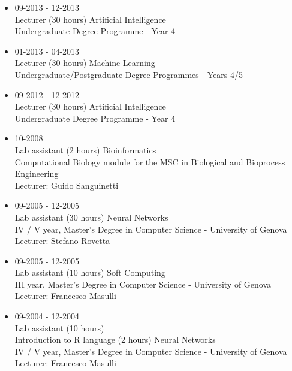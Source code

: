 \documentclass[a4paper,10pt]{article}
\begin{document}
\begin{itemize}
\item 09-2013 - 12-2013 \\
  Lecturer (30 hours)
  Artificial Intelligence \\
  Undergraduate Degree Programme - Year 4
\item 01-2013 - 04-2013 \\
  Lecturer (30 hours)
  Machine Learning \\
  Undergraduate/Postgraduate Degree Programmes - Years 4/5
\item 09-2012 - 12-2012 \\
  Lecturer (30 hours)
  Artificial Intelligence \\
  Undergraduate Degree Programme - Year 4
\item 10-2008 \\
  Lab assistant (2 hours)
  Bioinformatics \\
  Computational Biology module for the MSC in Biological and Bioprocess Engineering \\
  Lecturer: Guido Sanguinetti
\item 09-2005 - 12-2005 \\
  Lab assistant (30 hours)
  Neural Networks \\
  IV / V year, Master's Degree in Computer Science - University of Genova \\
  Lecturer: Stefano Rovetta
\item 09-2005 - 12-2005 \\
  Lab assistant (10 hours)
  Soft Computing \\
  III year, Master's Degree in Computer Science - University of Genova \\
  Lecturer: Francesco Masulli
\item 09-2004 - 12-2004 \\
  Lab assistant (10 hours) \\
  Introduction to R language (2 hours)
  Neural Networks \\
  IV / V year, Master's Degree in Computer Science - University of Genova \\
  Lecturer: Francesco Masulli
\end{itemize}

\end{document}
